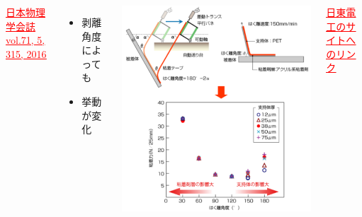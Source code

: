\documentclass[unicode,12pt]{beamer}%
\begin{document}
\begin{frame}
\begin{columns}[c, onlytextwidth]
		\href{https://www.jps.or.jp/books/gakkaishi/2016/05/71-05mijika.pdf}{\textcolor{red}{\underline{\scriptsize{日本物理学会誌 vol.71, 5, 315, 2016}}}}
		\begin{itemize}
			\item 剥離角度によっても
			\item 挙動が変化
		\end{itemize}
		\centering
		\includegraphics[width=.8\textwidth]{hakuri4.png}

		\href{https://www.nitto.com/jp/ja/rd/base/analyze/adhesion/}{\textcolor{red}{\underline{\scriptsize{日東電工のサイトへのリンク}}}}
	\end{columns}
\end{frame}
\end{document}

